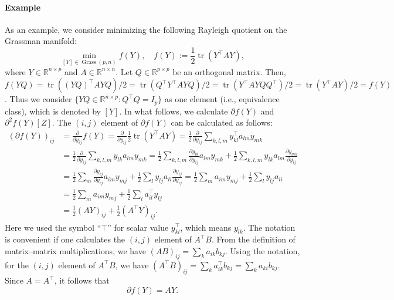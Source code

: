 \paragraph{Example}\label{ex:grassmann-rayleigh}
{As an example, we consider minimizing the following Rayleigh quotient on the Grassman manifold:}
\[\min_{[Y]\in\operatorname{Grass}(p,n)}f(Y),\quad f(Y):=\frac12\operatorname{tr}(Y^{\top}AY),\]
{where $Y\in\mathbb{R}^{n\times p}$ and $A\in\mathbb{R}^{n\times n}$. Let $Q\in\mathbb{R}^{p\times p}$ be an orthogonal matrix. Then, $f(YQ)=\operatorname{tr}((YQ)^{\top}AYQ)/2=\operatorname{tr}(Q^{\top}Y^{\top}AYQ)/2=\operatorname{tr}(Y^{\top}AYQQ^{\top})/2=\operatorname{tr}(Y^{\top}AY)/2=f(Y)$. Thus we consider $\{YQ\in\mathbb{R}^{n\times p}:Q^{\top}Q=I_p\}$ as one element (i.e., equivalence class), which is denoted by $[Y]$. In what follows, we calculate $\partial f(Y)$ and $\partial^2f(Y)[Z]$.}
{The $(i,j)$ element of $\partial f(Y)$ can be calculated as follows:}
\[\begin{aligned}
(\partial f(Y))_{ij}&=\frac{\partial}{\partial y_{ij}}f(Y)=\frac{\partial}{\partial y_{ij}}\frac12\operatorname{tr}(Y^{\top}AY)=\frac12\frac{\partial}{\partial y_{ij}}\sum_{k,l,m}y_{kl}^{\top}a_{lm}y_{mk}\\
&=\frac12\frac{\partial}{\partial y_{ij}}\sum_{k,l,m}y_{lk}a_{lm}y_{mk}
=\frac12\sum_{k,l,m}\frac{\partial y_{lk}}{\partial y_{ij}}a_{lm}y_{mk}+\frac12\sum_{k,l,m}y_{lk}a_{lm}\frac{\partial y_{mk}}{\partial y_{ij}}\\
&=\frac12\sum_m\frac{\partial y_{ij}}{\partial y_{ij}}a_{im}y_{mj}+\frac12\sum_ly_{lj}a_{li}\frac{\partial y_{ij}}{\partial y_{ij}}
=\frac12\sum_ma_{im}y_{mj}+\frac12\sum_ly_{lj}a_{li}\\
&=\frac12\sum_ma_{im}y_{mj}+\frac12\sum_la_{il}^{\top}y_{lj}\\
&=\frac12(AY)_{ij}+\frac12(A^{\top}Y)_{ij}.
\end{aligned}\]
{Here we used the symbol ``$\top$'' for scalar value $y_{kl}^{\top}$, which means $y_{lk}$. The notation is convenient if one calculates the $(i,j)$ element of $A^{\top}B$. From the definition of matrix--matrix multiplications, we have $(AB)_{ij}=\sum_ka_{ik}b_{kj}$. Using the notation, for the $(i,j)$ element of $A^{\top}B$, we have $(A^{\top}B)_{ij}=\sum_ka_{ik}^{\top}b_{kj}=\sum_ka_{ki}b_{kj}$. Since $A=A^{\top}$, it follows that}
\begin{equation}\label{eq:rayleigh-gradient}
\partial f(Y)=AY.
\end{equation}
